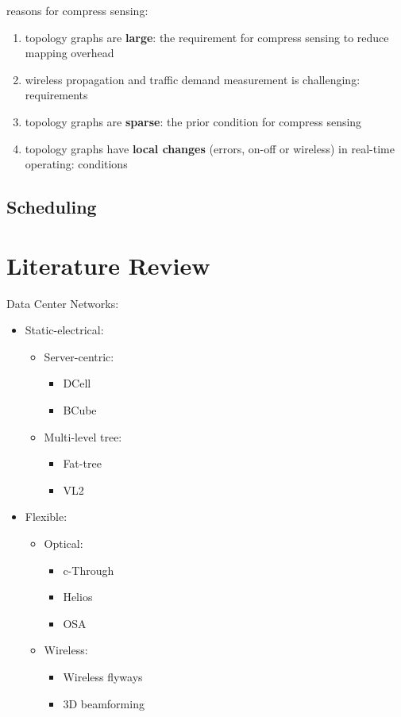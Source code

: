 \documentclass[journal,onecolumn,11pt]{IEEEtran}
\begin{document}
reasons for compress sensing:
\begin{enumerate}
  \item topology graphs are \textbf{large}: the requirement for compress sensing to reduce mapping overhead
  \item wireless propagation and traffic demand measurement is challenging: requirements
  \item topology graphs are \textbf{sparse}: the prior condition for compress sensing
  \item topology graphs have \textbf{local changes} (errors, on-off or wireless) in real-time operating: conditions
\end{enumerate}

\subsection{Scheduling}

\section{Literature Review}

Data Center Networks:
\begin{itemize}
  \item Static-electrical:
  \begin{itemize}
    \item Server-centric:
    \begin{itemize}
      \item DCell\cite{Guo:2008:DSF:1402958.1402968}
      \item BCube\cite{Guo:2009:BHP:1592568.1592577}
    \end{itemize}
    \item Multi-level tree:
    \begin{itemize}
      \item Fat-tree\cite{Al-Fares:2008:SCD:1402958.1402967}
      \item VL2\cite{Greenberg:2009:VSF:1592568.1592576}
    \end{itemize}
  \end{itemize}
  \item Flexible:
  \begin{itemize}
    \item Optical:
    \begin{itemize}
      \item c-Through\cite{Wang:2010:CPO:1851182.1851222}
      \item Helios\cite{Farrington:2010:HHE:1851182.1851223}
      \item OSA\cite{chen2012osa}
    \end{itemize}
    \item Wireless:
    \begin{itemize}
      \item Wireless flyways\cite{Halperin:2011:ADC:2018436.2018442}
      \item 3D beamforming\cite{Zhou:2012:MMC:2342356.2342440}
    \end{itemize}
  \end{itemize}
\end{itemize}
\end{document}
